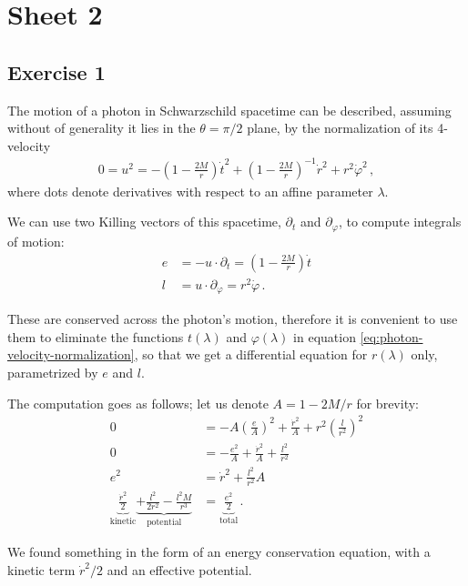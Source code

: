 \documentclass[main.tex]{subfiles}
\begin{document}
\section{Sheet 2}

\subsection{Exercise 1}

The motion of a photon in Schwarzschild spacetime can be described, 
assuming without of generality it lies in the \(\theta = \pi / 2\) plane, 
by the normalization of its 4-velocity %
\begin{align} \label{eq:photon-velocity-normalization}
0 = u^2 = - \left(1 - \frac{2M}{r}\right) \dot{t}^2 + \left(1 - \frac{2M}{r}\right)^{-1} \dot{r}^2 + r^2 \dot{\varphi}^2
\,,
\end{align}
%
where dots denote derivatives with respect to an affine parameter \(\lambda\). 

We can use two Killing vectors of this spacetime, \(\partial_t\) and \(\partial_\varphi\), 
to compute integrals of motion: %
\begin{align}
e &= - u \cdot \partial_t = \left(1 - \frac{2M}{r}\right) \dot{t}  \\
l &= u \cdot \partial_\varphi = r^2 \dot{\varphi}
\,.
\end{align}

These are conserved across the photon's motion, therefore it is convenient to use them to 
eliminate the functions \(t(\lambda )\) and \(\varphi (\lambda )\) in equation \eqref{eq:photon-velocity-normalization}, 
so that we get a differential equation for \(r(\lambda )\) only, parametrized by \(e\) and \(l\).

The computation goes as follows; let us denote \(A =1 - 2M/r\) for brevity: 
%
\begin{align}
0 &= - A \left( \frac{e}{A}\right)^2 + \frac{\dot{r}^2}{A} + r^2 \left( \frac{l}{r^2}\right)^2   \\
0 &= - \frac{e^2}{A} + \frac{\dot{r}^2}{A} + \frac{l^2}{r^2}  \\
e^2 &= \dot{r}^2 + \frac{l^2}{r^2} A \\
\underbrace{\frac{\dot{r}^2}{2}}_{\text{kinetic}} 
\underbrace{+ \frac{l^2}{2r^2} - \frac{l^2M}{r^3}}_{\text{potential}} &= \underbrace{\frac{e^2}{2}}_{\text{total}}
\,.
\end{align}

We found something in the form of an energy conservation equation, 
with a kinetic term \(\dot{r}^2 / 2\) and an effective potential. 
\end{document}
